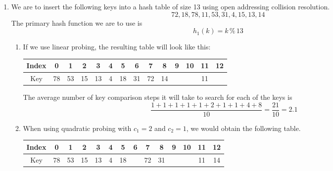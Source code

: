\documentclass[fleqn]{article}
\newenvironment{answers}{ %
	\begin{enumerate}
		\setlength{\itemsep}{\bigskipamount}
}{\end{enumerate}}
\DeclareMathOperator{\Mod}{\%}
\begin{document}
\begin{answers}
	When searching the table for a specific key, we can reconstruct the key \(k\) of any table entry with the \(q(k)\) that we stored and the \(h(k)\) which we are computing during the search like so.
	\[k = q(k) \times m + h(k)\]

	However, this would only work in a hash table that uses chaining to resolve collisions. If the table uses open addressing instead, then it would be impossible to use this optimisation. This is because in open addressing, any key can potentially end up at any address, so there may be a different key in the same spot as the key we seek, but with the same quotient \(q(k)\). Therefore it would be impossible to determine which key it originated from. On the other hand, when using the chaining method, the index of the bucket in which an entry is located is enough to give us the missing information to know which key any particular quotient key belongs to.

	\item %
	We are to insert the following keys into a hash table of size 13 using open addressing collision resolution.
	\[72, 18, 78, 11, 53, 31, 4, 15, 13, 14\]
	The primary hash function we are to use is
	\[h_1(k) = k \Mod 13\]
	\begin{enumerate}
		\item %
		If we use linear probing, the resulting table will look like this:

		\noindent
		\begin{tabular}{||c||c|c|c|c|c|c|c|c|c|c|c|c|c||}
			\hline
			Index 	& 0  & 1  & 2  & 3  & 4  & 5  & 6  & 7  & 8  & 9  & 10 & 11 & 12 \\
			\hline
			Key 	& 78 & 53 & 15 & 13 & 4  & 18 & 31 & 72 & 14 &    &    & 11 &    \\
			\hline
		\end{tabular}

		The average number of key comparison steps it will take to search for each of the keys is
		\[\frac{1 + 1 + 1 + 1 + 1 + 2 + 1 + 1 + 4 + 8}{10} = \frac{21}{10} = 2.1\]

		\item %
		When using quadratic probing with \(c_1 = 2\) and \(c_2 = 1\), we would obtain the following table.

		\noindent
		\begin{tabular}{||c||c|c|c|c|c|c|c|c|c|c|c|c|c||}
			\hline
			Index 	& 0  & 1  & 2  & 3  & 4  & 5  & 6  & 7  & 8  & 9  & 10 & 11 & 12 \\
			\hline
			Key 	& 78 & 53 & 15 & 13 & 4  & 18 &    & 72 & 31 &    &    & 11 & 14 \\
			\hline
		\end{tabular}


\end{enumerate}
\end{answers}
\end{document}
